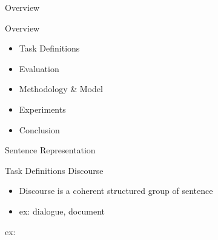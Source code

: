 \documentclass[10pt]{beamer}
\begin{document}
\begin{frame}{Overview}

Overview
\begin{itemize}
    \item Task Definitions
    \item Evaluation
    \item Methodology \& Model
    \item Experiments
    \item Conclusion
\end{itemize}

\end{frame}

\begin{frame}[t]{Sentence Representation}

    \begin{figure}
        \begin{center}
        \end{center}
    \end{figure}
    \begin{center}
    \end{center}
\end{frame}

\begin{frame}{Task Definitions}
    Discourse 
    \begin{itemize}
        \item Discourse is a coherent structured group of sentence 
        \item ex: dialogue, document
    \end{itemize}

    ex: 

    \begin{figure}
        \begin{center}
        \end{center}
    \end{figure}

\end{frame}
\end{document}
